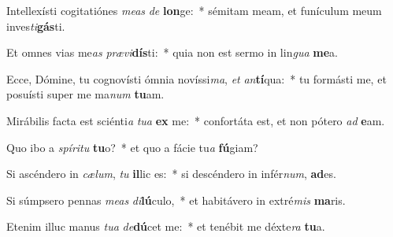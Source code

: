 \item Intellexísti cogitatiónes \textit{me}\textit{as} \textit{de} \textbf{lon}ge:~* sémitam meam, et funículum meum inves\textit{ti}\textbf{gás}ti.
\item Et omnes vias me\textit{as} \textit{præ}\textit{vi}\textbf{dís}ti:~* quia non est sermo in lin\textit{gua} \textbf{me}a.
\item Ecce, Dómine, tu cognovísti ómnia novíssi\textit{ma}, \textit{et} \textit{an}\textbf{tí}qua:~* tu formásti me, et posuísti super me ma\textit{num} \textbf{tu}am.
\item Mirábilis facta est sciénti\textit{a} \textit{tu}\textit{a} \textbf{ex} me:~* confortáta est, et non pótero \textit{ad} \textbf{e}am.
\item Quo ibo a \textit{spí}\textit{ri}\textit{tu} \textbf{tu}o?~* et quo a fácie tu\textit{a} \textbf{fú}giam?
\item Si ascéndero in \textit{cæ}\textit{lum}, \textit{tu} \textbf{il}lic es:~* si descéndero in infér\textit{num}, \textbf{ad}es.
\item Si súmpsero pennas \textit{me}\textit{as} \textit{di}\textbf{lú}culo,~* et habitávero in extré\textit{mis} \textbf{ma}ris.
\item Etenim illuc manus \textit{tu}\textit{a} \textit{de}\textbf{dú}cet me:~* et tenébit me déxte\textit{ra} \textbf{tu}a.
